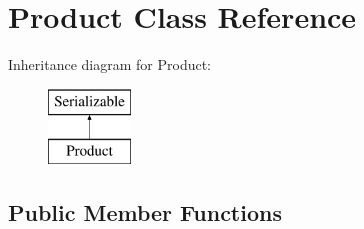 \hypertarget{class_product}{}\section{Product Class Reference}
\label{class_product}
Inheritance diagram for Product\+:\begin{figure}[H]
\begin{center}
\leavevmode
\includegraphics[height=2.000000cm]{class_product}
\end{center}
\end{figure}
\subsection*{Public Member Functions}
